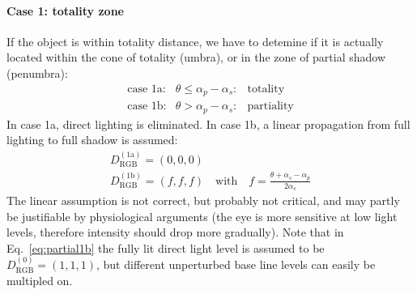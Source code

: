 \documentclass[Orbiter Technical Reference.tex]{subfiles}
\begin{document}
\paragraph{Case 1: totality zone}
If the object is within totality distance, we have to detemine if it is actually located within the cone of totality (umbra), or in the zone of partial shadow (penumbra):
\begin{equation}
\begin{array}{lcl}
\text{case 1a:} & \theta \leq \alpha_p-\alpha_s: & \text{totality}\\
\text{case 1b:} & \theta > \alpha_p-\alpha_s: & \text{partiality}
\end{array}
\end{equation}
In case 1a, direct lighting is eliminated. In case 1b, a linear propagation from full lighting to full shadow is assumed:
\begin{equation}\label{eq:partial1b}
\begin{array}{l}
D_\text{RGB}^{(\text{1a})} = (0,0,0)\\
D_\text{RGB}^{(\text{1b})} = (f,f,f) \quad\text{with}\quad f = \frac{\theta+\alpha_s-\alpha_p}{2 \alpha_s}
\end{array}
\end{equation}
The linear assumption is not correct, but probably not critical, and may partly be justifiable by physiological arguments (the eye is more sensitive at low light levels, therefore intensity should drop more gradually).
Note that in Eq.~\ref{eq:partial1b} the fully lit direct light level is assumed to be $D_\text{RGB}^{(0)} = (1,1,1)$, but different unperturbed base line levels can easily be multipled on.
\end{document}
